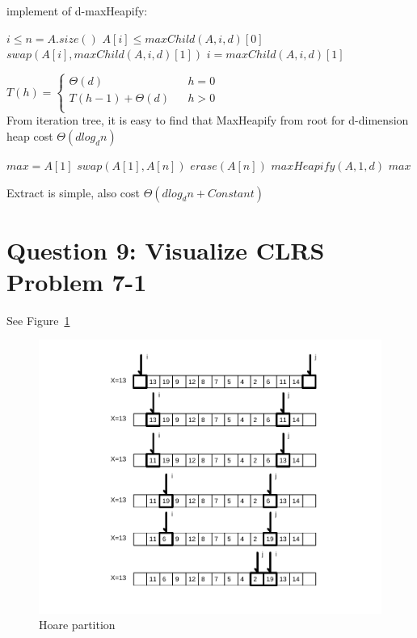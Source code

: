 \documentclass[]{article}
\begin{document}
implement of d-maxHeapify:\\
\begin{codebox}
	
	\li \While $i \le n = A.size()$
	\li \Do	\If $A[i] \le maxChild(A,i,d)[0]$
	\li 		\Then $swap(A[i], maxChild(A,i,d)[1])$
	\li 		  	$i = maxChild(A,i,d)[1]$
	\End
	\End
	\li \Return
\end{codebox}

$ T(h)=\left\{
\begin{array}{lcl}
\Theta(d)       &      & {h = 0}\\
T(h-1) + \Theta(d)     &      & {h > 0}\\
\end{array} \right. $\\

From iteration tree, it is easy to find that MaxHeapify from root for d-dimension heap cost $\Theta(dlog_{d}n)$
	
\begin{codebox}
	
	\li $max = A[1]$
	\li $swap(A[1], A[n])$
	\li $erase(A[n])$
	\li $maxHeapify(A, 1, d)$
	\li \Return $max$\\
\end{codebox}

Extract is simple, also cost  $\Theta(dlog_{d}n + Constant)$

\section{Question 9: Visualize CLRS Problem 7-1}

See Figure~\ref{fig:2hp}

\begin{figure}
	\centering
	\includegraphics[width=0.9\linewidth]{2_hpar}
	\caption{Hoare partition}
	\label{fig:2hp}
\end{figure}
\end{document}
